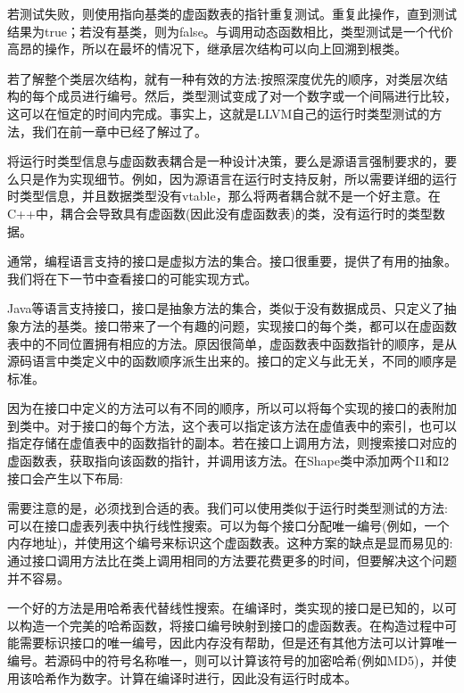 
若测试失败，则使用指向基类的虚函数表的指针重复测试。重复此操作，直到测试结果为true；若没有基类，则为false。与调用动态函数相比，类型测试是一个代价高昂的操作，所以在最坏的情况下，继承层次结构可以向上回溯到根类。

若了解整个类层次结构，就有一种有效的方法:按照深度优先的顺序，对类层次结构的每个成员进行编号。然后，类型测试变成了对一个数字或一个间隔进行比较，这可以在恒定的时间内完成。事实上，这就是LLVM自己的运行时类型测试的方法，我们在前一章中已经了解过了。

将运行时类型信息与虚函数表耦合是一种设计决策，要么是源语言强制要求的，要么只是作为实现细节。例如，因为源语言在运行时支持反射，所以需要详细的运行时类型信息，并且数据类型没有vtable，那么将两者耦合就不是一个好主意。在C++中，耦合会导致具有虚函数(因此没有虚函数表)的类，没有运行时的类型数据。

通常，编程语言支持的接口是虚拟方法的集合。接口很重要，提供了有用的抽象。我们将在下一节中查看接口的可能实现方式。


Java等语言支持接口，接口是抽象方法的集合，类似于没有数据成员、只定义了抽象方法的基类。接口带来了一个有趣的问题，实现接口的每个类，都可以在虚函数表中的不同位置拥有相应的方法。原因很简单，虚函数表中函数指针的顺序，是从源码语言中类定义中的函数顺序派生出来的。接口的定义与此无关，不同的顺序是标准。

因为在接口中定义的方法可以有不同的顺序，所以可以将每个实现的接口的表附加到类中。对于接口的每个方法，这个表可以指定该方法在虚值表中的索引，也可以指定存储在虚值表中的函数指针的副本。若在接口上调用方法，则搜索接口对应的虚函数表，获取指向该函数的指针，并调用该方法。在Shape类中添加两个I1和I2接口会产生以下布局:


需要注意的是，必须找到合适的表。我们可以使用类似于运行时类型测试的方法:可以在接口虚表列表中执行线性搜索。可以为每个接口分配唯一编号(例如，一个内存地址)，并使用这个编号来标识这个虚函数表。这种方案的缺点是显而易见的:通过接口调用方法比在类上调用相同的方法要花费更多的时间，但要解决这个问题并不容易。

一个好的方法是用哈希表代替线性搜索。在编译时，类实现的接口是已知的，以可以构造一个完美的哈希函数，将接口编号映射到接口的虚函数表。在构造过程中可能需要标识接口的唯一编号，因此内存没有帮助，但是还有其他方法可以计算唯一编号。若源码中的符号名称唯一，则可以计算该符号的加密哈希(例如MD5)，并使用该哈希作为数字。计算在编译时进行，因此没有运行时成本。

